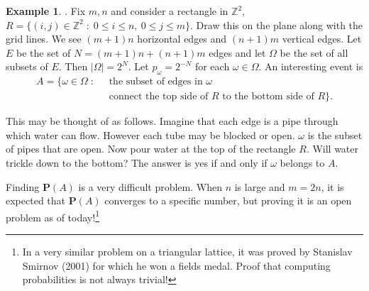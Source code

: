 \documentclass[preprint,  11pt]{amsart}
\newcommand{\parag}[1]{\vspace{4mm}\noindent{\bfseries #1}}
\theoremstyle{plain} %
\theoremstyle{definition} %
\newtheorem{example}[theorem]{Example}
\begin{document}
\begin{example}\parag{Percolation}. Fix $m,n$ and consider a rectangle in $\mathbb{Z}^{2}$, $R=\{(i,j)\in \mathbb{Z}^{2}{\; : \;} 0\le i\le n, \ 0\le j\le m\}$. Draw this on the plane along with the grid lines. We see $(m+1)n$ horizontal edges and $(n+1)m$ vertical edges. Let $E$ be the set of $N=(m+1)n+(n+1)m$ edges and let $\Omega$ be the set of all subsets of $E$. Then $|\Omega|=2^{N}$. Let $p_{\omega}=2^{-N}$ for each $\omega \in \Omega$. An interesting event is 
\begin{align*}
A=\{\omega \in \Omega{\; : \;} & \mbox{ the subset of edges in }\omega \\
 & \mbox{ connect  the top side of }R \mbox{ to the bottom side of }R\}.
\end{align*}

This may be thought of as follows. Imagine that each edge is a pipe through which water can flow. However each tube may be blocked or open. $\omega$ is the subset of pipes that are open. Now pour water at the top of the rectangle $R$. Will water trickle down to the bottom? The answer is yes if and only if $\omega$ belongs to $A$.

Finding $\mathbf{P}(A)$ is a very difficult problem. When $n$ is large and $m=2 n$, it is expected that $\mathbf{P}(A)$ converges to a specific number, but proving it is an open problem as of today!\footnote{In a very similar problem on a triangular lattice, it was proved by Stanislav Smirnov (2001) for which he won a fields medal. Proof that computing probabilities is not always trivial!}
\end{example}
\end{document}

